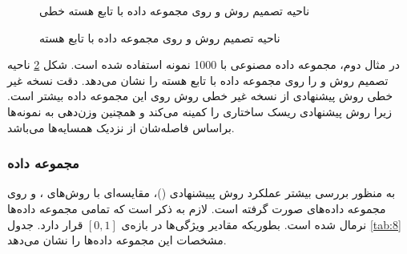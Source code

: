  \begin{figure}[!t]
 	\centering
 	\caption{ناحیه تصمیم روش  و  روی مجموعه داده  با تابع هسته خطی}
 	\label{fig:WLTSVM-vs-RKNN-TSVM-R}
 \end{figure}
\begin{figure}[!t]
	\centering
	\caption{ناحیه تصمیم روش   و  روی مجموعه داده  با تابع هسته }
	\label{fig:WLTSVM-vs-RKNN-TSVM-C}
\end{figure}

در مثال دوم، مجموعه داده مصنوعی  با 1000 نمونه استفاده شده است. شکل \ref{fig:WLTSVM-vs-RKNN-TSVM-C} ناحیه تصمیم روش  و  را روی مجموعه داده  با تابع هسته  را نشان می‌دهد. دقت نسخه غیر خطی روش پیشنهادی از نسخه غیر خطی روش  روی این مجموعه داده بیشتر است. زیرا روش پیشنهادی ریسک ساختاری را کمینه می‌کند و همچنین وزن‌دهی به نمونه‌ها براساس فاصله‌شان از نزدیک همسایه‌ها می‌باشد.

\subsubsection{مجموعه داده }\label{sec:5:3:3:2}
به منظور بررسی بیشتر عملکرد روش پییشنهادی ()، مقایسه‌ای با روش‌های ،  و  روی مجموعه داده‌های  صورت گرفته است. لازم به ذکر است که تمامی مجموعه داده‌ها نرمال شده است. بطوریکه مقادیر ویژگی‌ها در بازه‌ی   $\left[0,1\right]$ قرار دارد. جدول \ref{tab:8} مشخصات این مجموعه داده‌ها را نشان می‌دهد.

